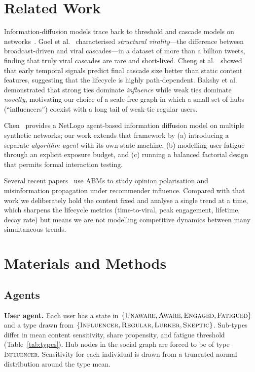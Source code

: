 \documentclass[sigconf, nonacm]{acmart}
\begin{document}
\section{Related Work}
Information-diffusion models trace back to threshold and cascade models
on networks~\cite{granovetter1978threshold,goldenberg2001talk}.
Goel et al.~\cite{goel2016structural} characterised \emph{structural
virality}---the difference between broadcast-driven and viral
cascades---in a dataset of more than a billion tweets, finding that
truly viral cascades are rare and short-lived.  Cheng et
al.~\cite{cheng2014can} showed that early temporal signals predict
final cascade size better than static content features, suggesting that
the lifecycle is highly path-dependent.
Bakshy et al.~\cite{bakshy2012role} demonstrated that strong ties dominate
\emph{influence} while weak ties dominate \emph{novelty}, motivating our
choice of a scale-free graph in which a small set of hubs (``influencers'')
coexist with a long tail of weak-tie regular users.

Chen~\cite{chen2019diffusion} provides a NetLogo agent-based information
diffusion model on multiple synthetic networks; our work extends that
framework by (a) introducing a separate \emph{algorithm agent} with its
own state machine, (b) modelling user fatigue through an explicit
exposure budget, and (c) running a balanced factorial design that
permits formal interaction testing.

Several recent papers~\cite{ronaghan2020abm,kong2022opinion,gausen2022abm}
use ABMs to study opinion polarisation and misinformation propagation
under recommender influence.  Compared with that work we deliberately
hold the content fixed and analyse a single trend at a time, which
sharpens the lifecycle metrics (time-to-viral, peak engagement, lifetime,
decay rate) but means we are not modelling competitive dynamics between
many simultaneous trends.

\section{Materials and Methods}

\subsection{Agents}
\textbf{User agent.}
Each user has a state in
$\{\textsc{Unaware}, \textsc{Aware}, \textsc{Engaged}, \textsc{Fatigued}\}$
and a type drawn from
$\{\textsc{Influencer}, \textsc{Regular}, \textsc{Lurker}, \textsc{Skeptic}\}$.
Sub-types differ in mean content sensitivity, share propensity, and
fatigue threshold (Table~\ref{tab:types}).  Hub nodes in the social graph
are forced to be of type \textsc{Influencer}.  Sensitivity for each
individual is drawn from a truncated normal distribution around the type
mean.
\end{document}
